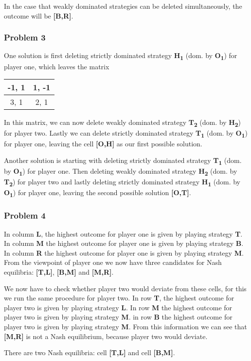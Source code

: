 \documentclass[]{article}
\begin{document}
In the case that weakly dominated strategies can be deleted simultaneously, the outcome will be \textbf{[B,R]}.
\subsubsection{Problem 3}\label{problem-3}

One solution is first deleting strictly dominated strategy \textbf{H\textsubscript{1}} (dom. by \textbf{O\textsubscript{1}}) for
player one, which leaves the matrix

\begin{tabular}{| c | c |}
  \hline			
  -1, 1 &  1, -1 \\
\hline
  3, 1 & 2, 1 \\
  \hline  
\end{tabular}

In this matrix, we can now delete weakly dominated strategy \textbf{T\textsubscript{2}} (dom. by \textbf{H\textsubscript{2}}) for
player two. Lastly we can delete strictly dominated strategy \textbf{T\textsubscript{1}} (dom. by \textbf{O\textsubscript{1}})
for player one, leaving the cell \textbf{[O,H]} as our first possible
solution.

Another solution is starting with deleting strictly dominated strategy
\textbf{T\textsubscript{1}} (dom. by \textbf{O\textsubscript{1}}) for player one. Then deleting weakly dominated strategy
\textbf{H\textsubscript{2}} (dom. by \textbf{T\textsubscript{2}}) for player two and lastly deleting strictly dominated strategy
\textbf{H\textsubscript{1}} (dom. by \textbf{O\textsubscript{1}}) for player one, leaving the second possible solution \textbf{[O,T]}.

\subsubsection{Problem 4}\label{problem-4}

In column \textbf{L}, the highest outcome for player one is given by
playing strategy \textbf{T}. In column \textbf{M} the highest outcome for
player one is given by playing strategy \textbf{B}. In column \textbf{R} the
highest outcome for player one is given by playing strategy \textbf{M}.
From the viewpoint of player one we now have three candidates for Nash
equilibria: \textbf{[T,L]}, \textbf{[B,M]} and \textbf{[M,R]}.\strut

We now have to check whether player two would deviate from these cells,
for this we run the same procedure for player two. In row \textbf{T}, the
highest outcome for player two is given by playing strategy \textbf{L}. In
row \textbf{M} the highest outcome for player two is given by playing
strategy \textbf{M}. in row \textbf{B} the highest outcome for player two is
given by playing strategy \textbf{M}. From this information we can see
that \textbf{[M,R]} is not a Nash equilibrium, because player two would
deviate.\strut
There are two Nash equilibria: cell \textbf{[T,L]} and cell \textbf{[B,M]}.\strut
\end{document}
